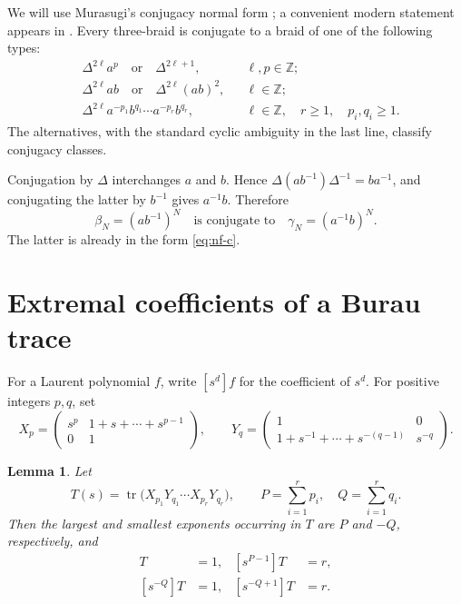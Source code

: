 \documentclass[11pt]{amsart}
\newtheorem{lemma}[theorem]{Lemma}
\theoremstyle{remark}
\newcommand{\tr}{\operatorname{tr}}
\begin{document}
We will use Murasugi's conjugacy normal form \cite[Proposition~2.1]{Murasugi}; a
convenient modern statement appears in \cite[Definition~4.15]{Truol}.  Every
three-braid is conjugate to a braid of one of the following types:
\begin{align}
  &\Delta^{2\ell}a^p \quad\text{or}\quad \Delta^{2\ell+1},
       &&\ell,p\in\mathbb Z; \label{eq:nf-a}\\
  &\Delta^{2\ell}ab \quad\text{or}\quad \Delta^{2\ell}(ab)^2,
       &&\ell\in\mathbb Z; \label{eq:nf-b}\\
  &\Delta^{2\ell}a^{-p_1}b^{q_1}\cdots a^{-p_r}b^{q_r},
       &&\ell\in\mathbb Z,\quad r\geq1,\quad p_i,q_i\geq1. \label{eq:nf-c}
\end{align}
The alternatives, with the standard cyclic ambiguity in the last line, classify
conjugacy classes.

Conjugation by \(\Delta\) interchanges \(a\) and \(b\).  Hence
\(\Delta(ab^{-1})\Delta^{-1}=ba^{-1}\), and conjugating the latter by \(b^{-1}\)
gives \(a^{-1}b\).  Therefore
\begin{equation}\label{eq:target-conjugate}
  \beta_N=(ab^{-1})^N
  \quad\text{is conjugate to}\quad
  \gamma_N=(a^{-1}b)^N.
\end{equation}
The latter is already in the form \eqref{eq:nf-c}.

\section{Extremal coefficients of a Burau trace}

For a Laurent polynomial \(f\), write \([s^d]f\) for the coefficient of \(s^d\).
For positive integers \(p,q\), set
\[
 X_p=
 \begin{pmatrix}
 s^p&1+s+\cdots+s^{p-1}\\0&1
 \end{pmatrix},
 \qquad
 Y_q=
 \begin{pmatrix}
 1&0\\1+s^{-1}+\cdots+s^{-(q-1)}&s^{-q}
 \end{pmatrix}.
\]

\begin{lemma}\label{lem:trace-coefficients}
Let
\[
  T(s)=\tr\bigl(X_{p_1}Y_{q_1}\cdots X_{p_r}Y_{q_r}\bigr),
  \qquad
  P=\sum_{i=1}^r p_i,
  \quad Q=\sum_{i=1}^r q_i.
\]
Then the largest and smallest exponents occurring in \(T\) are \(P\) and \(-Q\),
respectively, and
\begin{align*}
  [s^P]T&=1,& [s^{P-1}]T&=r,\\
  [s^{-Q}]T&=1,& [s^{-Q+1}]T&=r.
\end{align*}
\end{lemma}
\end{document}

